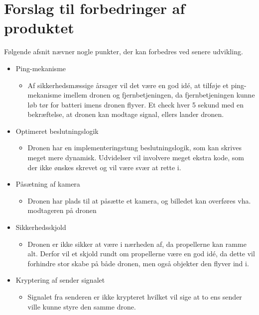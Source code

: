 \documentclass[Main]{subfiles}
\begin{document}
\section{Forslag til forbedringer af produktet}

Følgende afsnit nævner nogle punkter, der kan forbedres ved senere udvikling.

\begin{itemize}
\item Ping-mekanisme
\vspace{-10pt}
	\begin{itemize}
	\item Af sikkerhedsmæssige årsager vil det være en god idé, at tilføje et ping-mekanisme imellem dronen og fjernbetjeningen, da fjernbetjeningen kunne løb tør for batteri imens dronen flyver. 
	Et check hver 5 sekund med en bekræftelse, at dronen kan modtage signal, ellers lander dronen.
	\end{itemize}

\item Optimeret beslutningslogik
\vspace{-10pt}
	\begin{itemize}
	\item Dronen har en implementeringstung beslutningslogik, som kan skrives meget mere dynamisk. Udvidelser vil involvere meget ekstra kode, som der ikke ønskes skrevet og vil være svær at rette i.
	\end{itemize}
	
\item Påsætning af kamera
\vspace{-10pt}
	\begin{itemize}
	\item Dronen har plads til at påsætte et kamera, og billedet kan overføres vha. modtageren på dronen
	\end{itemize}
	
\item Sikkerhedsskjold
\vspace{-10pt}
	\begin{itemize}
	\item Dronen er ikke sikker at være i nærheden af, da propellerne kan ramme alt.
Derfor vil et skjold rundt om propellerne være en god idé, da dette vil forhindre stor skabe på både dronen, men også objekter den flyver ind i.
	\end{itemize}

	
\item Kryptering af sender signalet
\vspace{-10pt}
	\begin{itemize}
	\item Signalet fra senderen er ikke krypteret hvilket vil sige at to ens sender ville kunne styre den samme drone.
	\end{itemize}



\end{itemize}
\end{document}
